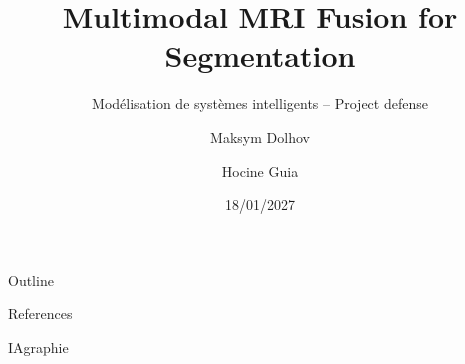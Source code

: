 \documentclass[aspectratio=169,10pt]{beamer}
\title{Multimodal MRI Fusion for Segmentation}
\subtitle{Modélisation de systèmes intelligents -- Project defense}
\author{Maksym Dolhov \and Hocine Guia}
\institute{M2 Informatique VMI, Université Paris Cité}
\date{18/01/2027}
\begin{document}
\maketitle

\begin{frame}{Outline}\end{frame}

\begin{frame}[allowframebreaks]{References}
  
  
\end{frame}

\begin{frame}{IAgraphie}
\end{frame}
\end{document}
